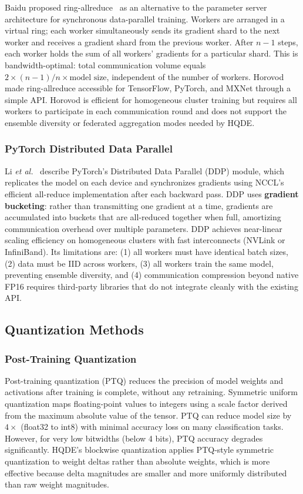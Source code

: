 \documentclass[journal,twoside]{IEEEtran}
\newcommand{\hqde}{\mbox{HQDE}\xspace}
\newcommand{\etal}{\textit{et al.}\xspace}
\begin{document}
Baidu proposed ring-allreduce~\cite{baidu2017ring} as an alternative
to the parameter server architecture for synchronous data-parallel
training. Workers are arranged in a virtual ring; each worker
simultaneously sends its gradient shard to the next worker and receives
a gradient shard from the previous worker. After $n-1$ steps, each
worker holds the sum of all workers' gradients for a particular shard.
This is bandwidth-optimal: total communication volume equals $2 \times
(n-1)/n \times \text{model size}$, independent of the number of
workers. Horovod~\cite{sergeev2018} made ring-allreduce accessible for
TensorFlow, PyTorch, and MXNet through a simple API. Horovod is
efficient for homogeneous cluster training but requires all workers to
participate in each communication round and does not support the
ensemble diversity or federated aggregation modes needed by \hqde{}.

\subsubsection{PyTorch Distributed Data Parallel}

Li \etal~\cite{li2020ddp} describe PyTorch's Distributed Data Parallel
(DDP) module, which replicates the model on each device and
synchronizes gradients using NCCL's efficient all-reduce implementation
after each backward pass. DDP uses \textbf{gradient bucketing}: rather
than transmitting one gradient at a time, gradients are accumulated
into buckets that are all-reduced together when full, amortizing
communication overhead over multiple parameters. DDP achieves near-linear
scaling efficiency on homogeneous clusters with fast interconnects
(NVLink or InfiniBand). Its limitations are: (1) all workers must have
identical batch sizes, (2) data must be IID across workers, (3) all
workers train the same model, preventing ensemble diversity, and
(4) communication compression beyond native FP16 requires third-party
libraries that do not integrate cleanly with the existing API.

\subsection{Quantization Methods}

\subsubsection{Post-Training Quantization}

Post-training quantization (PTQ) reduces the precision of model
weights and activations after training is complete, without any
retraining. Symmetric uniform quantization maps floating-point values
to integers using a scale factor derived from the maximum absolute
value of the tensor. PTQ can reduce model size by $4\times$ (float32
to int8) with minimal accuracy loss on many classification tasks.
However, for very low bitwidths (below 4 bits), PTQ accuracy degrades
significantly. \hqde{}'s blockwise quantization applies PTQ-style
symmetric quantization to weight deltas rather than absolute weights,
which is more effective because delta magnitudes are smaller and more
uniformly distributed than raw weight magnitudes.
\end{document}
